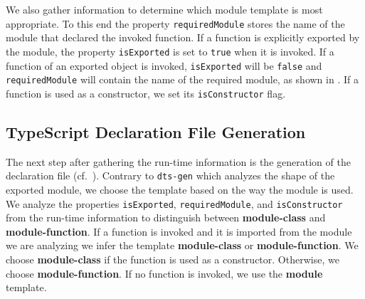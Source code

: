 \documentclass[sigconf]{acmart}
\begin{document}
We also gather information to determine which  module template is most
appropriate. To this end
the property \texttt{requiredModule} stores the name of the module that declared the invoked function. If a function is explicitly 
exported by the module, the property \texttt{isExported} is set to \texttt{true} when it is invoked. If a function of an 
exported object is invoked, \texttt{isExported} will be \texttt{false} and \texttt{requiredModule} will contain the name of 
the required module, as shown in
. If a function is
used as a constructor, we set its \texttt{isConstructor} flag.


\subsection{TypeScript Declaration File Generation}
\label{sec:typescr-decl-file}

The next step after gathering the run-time information is
the generation of the declaration file (cf.\
).
%
Contrary to \texttt{dts-gen} which analyzes the shape of the exported module, we choose the
template based on the way the module is used. We analyze the properties \texttt{isExported},
\texttt{requiredModule}, and \texttt{isConstructor} from the
run-time information to distinguish
between \textbf{module-class} and \textbf{module-function}. If a function is invoked and
it is imported from the module we are analyzing we infer the template
\textbf{module-class} or \textbf{module-function}. We choose \textbf{module-class} if the
function is used as a constructor. Otherwise, we choose
\textbf{module-function}.
If no function is invoked, we use the \textbf{module}
template.
\end{document}
